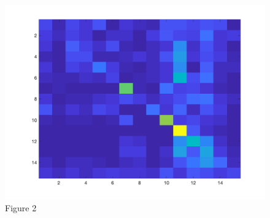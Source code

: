 \documentclass[letter, 11pt]{article}
\begin{document}
\begin{figure}[H]
        \includegraphics[width=\textwidth]{HW3/RESULT/ClassifyKNN_Tiny_confusion.png}
    \endminipage\hfill
    \caption*{Figure 2}
\end{figure}
\end{document}
